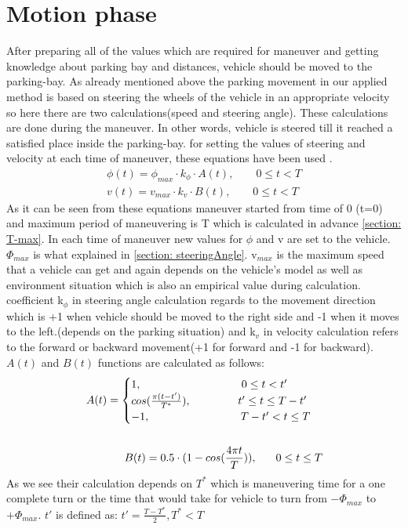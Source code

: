 \section{Motion phase} \label{section: motion}
After preparing all of the values which are required for maneuver and getting knowledge about parking bay and distances, vehicle should be moved to the parking-bay. As already mentioned above the parking movement in our applied method is based on steering the wheels of the vehicle in an appropriate velocity so here there are two calculations(speed and steering angle). These calculations are done during the maneuver. In other words, vehicle is steered till it reached a satisfied place inside the parking-bay. for setting the values of steering and velocity at each time of maneuver, these equations have been used \cite{parkingManeuver}. 
\begin{align}
    \phi(t) = \phi_{max} \cdot k_{\phi} \cdot A(t), \qquad 0\leq t < T \\
     v(t) = v_{max} \cdot k_v \cdot B(t), \qquad  0\leq t < T
\end{align}
As it can be seen from these equations maneuver started from time of 0 (t=0) and maximum period of maneuvering is T which is calculated in advance \ref{section: T-max}. In each time of maneuver new values for $\phi$ and v are set to the vehicle. $\Phi_{max}$ is what explained in \ref{section: steeringAngle}. v$_{max}$ is the maximum speed that a vehicle can get and again depends on the vehicle's model as well as environment situation which is also an empirical value during calculation. coefficient k$_{\phi}$ in steering angle calculation regards to the movement direction which is +1 when vehicle should be moved to the right side and -1 when it moves to the left.(depends on the parking situation) and k$_{v}$ in velocity calculation refers to the forward or backward movement(+1 for forward and -1 for backward). $A(t)$ and $B(t)$ functions are calculated as follows:
\begin{align}
    A(t) = \begin{cases}
					1, \hspace*{3,2cm} 0 \leq t < t'\\
					cos(\frac{\pi(t-t')}{T^*}), \hspace*{1,5cm} t' \leq t \leq T-t'\\
					-1, \hspace*{2,9cm} T-t' < t \leq T\\
				  \end{cases}\\ \nonumber\\
				  B(t) = 0.5 \cdot (1 - cos(\frac{4\pi t}{T})), \hspace*{0,6cm} 0 \leq t \leq T
\end{align}
As we see their calculation depends on $T^*$ which is maneuvering time for a one complete turn or the time that would take for vehicle to turn from $-\Phi_{max}$ to $+\Phi_{max}$. $t'$ is defined as: $t'= \frac{T-T^*}{2}, T^*<T$
